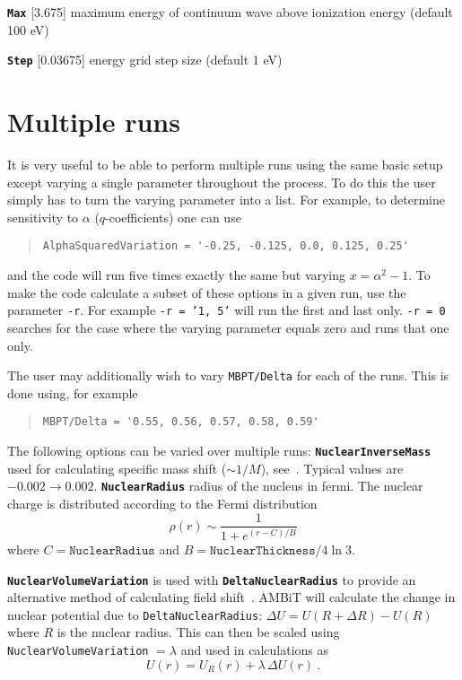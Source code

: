 \documentclass[a4paper,11pt]{article}
\newcommand{\option}[1]{\smallskip\noindent\textbf{\texttt{#1}}}
\begin{document}
\option{Max} [3.675] maximum energy of continuum wave above ionization energy (default 100 eV)

\option{Step} [0.03675] energy grid step size (default 1 eV)

\section{Multiple runs}

It is very useful to be able to perform multiple runs using the same basic setup except varying a single parameter throughout the process. To do this the user simply has to turn the varying parameter into a list. For example, to determine sensitivity to $\alpha$ ($q$-coefficients) one can use
\begin{quote}
\begin{verbatim}
AlphaSquaredVariation = '-0.25, -0.125, 0.0, 0.125, 0.25'
\end{verbatim}
\end{quote}
and the code will run five times exactly the same but varying $x = \alpha^2 - 1$. To make the code calculate a subset of these options in a given run, use the parameter \texttt{-r}. For example \texttt{-r = '1, 5'} will run the first and last only. \texttt{-r = 0} searches for the case where the varying parameter equals zero and runs that one only.

The user may additionally wish to vary \texttt{MBPT/Delta} for each of the runs. This is done using, for example
\begin{quote}
\begin{verbatim}
MBPT/Delta = '0.55, 0.56, 0.57, 0.58, 0.59'
\end{verbatim}
\end{quote}

The following options can be varied over multiple runs:
\option{NuclearInverseMass} used for calculating specific mass shift ($\sim 1/M$), see~\cite{berengut03pra,berengut05pra,berengut06pra}. Typical values are $-0.002 \rightarrow 0.002$.
\option{NuclearRadius} radius of the nucleus in fermi. The nuclear charge is distributed according to the Fermi distribution
\[
\rho(r) \sim \frac{1}{1 + e^{(r - C)/B}}
\]
where $C = \texttt{NuclearRadius}$ and $B = \texttt{NuclearThickness}/4\ln 3$.

\option{NuclearVolumeVariation} is used with \texttt{\textbf{DeltaNuclearRadius}} to provide an alternative method of calculating field shift~\cite{berengut03pra}. AMBiT will calculate the change in nuclear potential due to \texttt{DeltaNuclearRadius}: $\Delta U = U(R+\Delta R) - U(R)$ where $R$ is the nuclear radius. This can then be scaled using \texttt{NuclearVolumeVariation} $=\lambda$ and used in calculations as
\[
	U(r) = U_R(r) + \lambda\, \Delta U(r)\ .
\]
\end{document}
